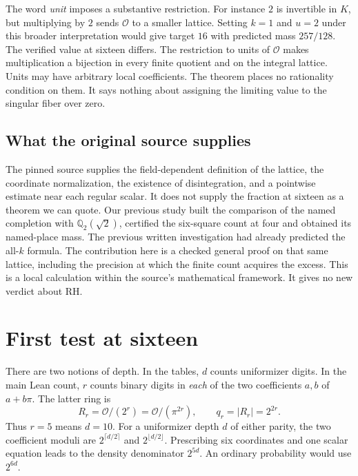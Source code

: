\documentclass[12pt,letterpaper]{article}
\begin{document}
The word \emph{unit} imposes a substantive restriction. For instance $2$ is invertible in $K$, but multiplying by $2$ sends $\mathcal O$ to a smaller lattice. Setting $k=1$ and $u=2$ under this broader interpretation would give target $16$ with predicted mass $257/128$. The verified value at sixteen differs. The restriction to units of $\mathcal O$ makes multiplication a bijection in every finite quotient and on the integral lattice. Units may have arbitrary local coefficients. The theorem places no rationality condition on them. It says nothing about assigning the limiting value to the singular fiber over zero.

\subsection{What the original source supplies}
The pinned source supplies the field-dependent definition of the lattice, the coordinate normalization, the existence of disintegration, and a pointwise estimate near each regular scalar. It does not supply the fraction at sixteen as a theorem we can quote. Our previous study built the comparison of the named completion with $\mathbb Q_2(\sqrt2)$, certified the six-square count at four and obtained its named-place mass. The previous written investigation had already predicted the all-$k$ formula. The contribution here is a checked general proof on that same lattice, including the precision at which the finite count acquires the excess. This is a local calculation within the source's mathematical framework. It gives no new verdict about RH.

\section{First test at sixteen}
There are two notions of depth. In the tables, $d$ counts uniformizer digits. In the main Lean count, $r$ counts binary digits in \emph{each} of the two coefficients $a,b$ of $a+b\pi$. The latter ring is
\[
 R_r=\mathcal O/(2^r)=\mathcal O/(\pi^{2r}), \qquad q_r=|R_r|=2^{2r}.
\]
Thus $r=5$ means $d=10$. For a uniformizer depth $d$ of either parity, the two coefficient moduli are $2^{\lceil d/2\rceil}$ and $2^{\lfloor d/2\rfloor}$. Prescribing six coordinates and one scalar equation leads to the density denominator $2^{5d}$. An ordinary probability would use $2^{6d}$.
\end{document}
